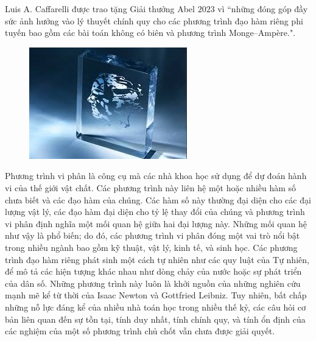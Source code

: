 \vspace*{150pt}


\begin{multicols}{2}	
	Luis A. Caffarelli được trao tặng Giải thưởng Abel $2023$ vì ``những đóng góp đầy sức ảnh hưởng vào lý thuyết chính quy cho  các phương trình đạo hàm riêng phi tuyến bao gồm các bài toán không có biên và phương trình Monge–Ampère.".
	\begin{figure}[H]
		\vspace*{-5pt}
		\centering
		\captionsetup{labelformat= empty, justification=centering}
		\includegraphics[width= 1\linewidth]{1}
		\vspace*{-15pt}
	\end{figure}
	Phương trình vi phân là công cụ mà các nhà khoa học sử dụng để dự đoán hành vi của thế giới vật chất. Các phương trình này liên hệ một hoặc nhiều hàm số chưa biết và các đạo hàm của chúng. Các hàm số này thường đại diện cho các đại lượng vật lý, các đạo hàm đại diện cho tỷ lệ thay đổi của chúng và phương trình vi phân định nghĩa một mối quan hệ giữa hai đại lượng này. Những mối quan hệ như vậy là phổ biến; do đó, các phương trình vi phân đóng một vai trò nổi bật trong nhiều ngành bao gồm kỹ thuật, vật lý, kinh tế, và sinh học.
	\vskip 0.1cm
	Các phương trình đạo hàm riêng phát sinh một cách tự nhiên như các quy luật của Tự nhiên, để mô tả các hiện tượng khác nhau như dòng chảy của nước hoặc sự phát triển của dân số. Những phương trình này luôn là khởi nguồn của những nghiên cứu mạnh mẽ kể từ thời của Isaac Newton và Gottfried Leibniz. Tuy nhiên, bất chấp những nỗ lực đáng kể của nhiều nhà toán học trong nhiều thế kỷ, các câu hỏi cơ bản liên quan đến sự tồn tại, tính duy nhất, tính chính quy, và tính ổn định của các nghiệm của một số phương trình chủ chốt vẫn chưa được giải quyết.

\end{multicols}
